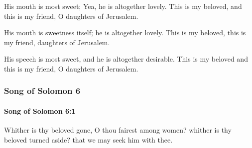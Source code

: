 			\begin{versebox}
					\item[BHS] 
					\item[LXX] 
					\item[ASV] His mouth is most sweet; Yea, he is altogether lovely. This is my beloved, and this is my friend, O daughters of Jerusalem.
					\item[NIV] His mouth is sweetness itself; he is altogether lovely. This is my beloved, this is my friend, daughters of Jerusalem.
					\item[NRSV] His speech is most sweet, and he is altogether desirable. This is my beloved and this is my friend, O daughters of Jerusalem.
			\end{versebox}
	\subsubsection{Song of Solomon 6} %
		\label{SONGOFSOLOMON-6}

		\paragraph{Song of Solomon 6:1} %
			\label{SONGOFSOLOMON-6-1}

			Whither is thy beloved gone, O thou fairest among women? whither is thy beloved turned aside? that we may seek him with thee.

